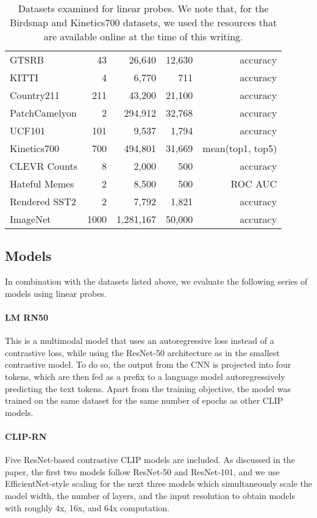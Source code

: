 \documentclass{article}
\begin{document}
\begin{table*}[t]
\begin{tabular}{lrrrr}
GTSRB & 43 & 26,640 & 12,630 & accuracy \\
KITTI & 4 & 6,770 & 711 & accuracy \\
Country211 & 211 & 43,200 & 21,100 & accuracy \\
PatchCamelyon & 2 & 294,912 & 32,768 & accuracy \\
UCF101 & 101 & 9,537 & 1,794 & accuracy \\
Kinetics700 & 700 & 494,801 & 31,669 & mean(top1, top5) \\
CLEVR Counts & 8 & 2,000 & 500 & accuracy \\
Hateful Memes & 2 & 8,500 & 500 & ROC AUC \\
Rendered SST2 & 2 & 7,792 & 1,821 & accuracy \\
ImageNet & 1000 & 1,281,167 & 50,000 & accuracy \\
\bottomrule
\end{tabular}
\caption{Datasets examined for linear probes. We note that, for the Birdsnap and Kinetics700 datasets, we used the resources that are available online at the time of this writing.}
\label{dataset_table}
\end{table*}

\subsection{Models}

In combination with the datasets listed above, we evaluate the following series of models using linear probes.

\paragraph{LM RN50} This is a multimodal model that uses an autoregressive loss instead of a contrastive loss, while using the ResNet-50 architecture as in the smallest contrastive model. To do so, the output from the CNN is projected into four tokens, which are then fed as a prefix to a language model autoregressively predicting the text tokens. Apart from the training objective, the model was trained on the same dataset for the same number of epochs as other CLIP models.
\paragraph{CLIP-RN} Five ResNet-based contrastive CLIP models are included. As discussed in the paper, the first two models follow ResNet-50 and ResNet-101, and we use EfficientNet-style \cite{tan2019efficientnet} scaling for the next three models which simultaneously scale the model width, the number of layers, and the input resolution to obtain models with roughly 4x, 16x, and 64x computation.
\end{document}
